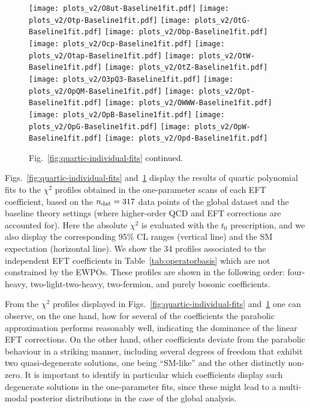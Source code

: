 \begin{figure}[htbp]
  \begin{center}
    \texttt{[image: plots\_v2/O8ut-Baseline1fit.pdf]}
\texttt{[image: plots\_v2/Otp-Baseline1fit.pdf]}
\texttt{[image: plots\_v2/OtG-Baseline1fit.pdf]}
\texttt{[image: plots\_v2/Obp-Baseline1fit.pdf]}
\texttt{[image: plots\_v2/Ocp-Baseline1fit.pdf]}
\texttt{[image: plots\_v2/Otap-Baseline1fit.pdf]}
\texttt{[image: plots\_v2/OtW-Baseline1fit.pdf]}
\texttt{[image: plots\_v2/OtZ-Baseline1fit.pdf]}
\texttt{[image: plots\_v2/O3pQ3-Baseline1fit.pdf]}
\texttt{[image: plots\_v2/OpQM-Baseline1fit.pdf]}
\texttt{[image: plots\_v2/Opt-Baseline1fit.pdf]}
\texttt{[image: plots\_v2/OWWW-Baseline1fit.pdf]}
\texttt{[image: plots\_v2/OpB-Baseline1fit.pdf]}
\texttt{[image: plots\_v2/OpG-Baseline1fit.pdf]}
\texttt{[image: plots\_v2/OpW-Baseline1fit.pdf]}
\texttt{[image: plots\_v2/Opd-Baseline1fit.pdf]}
\caption{\small Fig.~\ref{fig:quartic-individual-fits} continued.
     \label{fig:quartic-individual-fits-2} }
  \end{center}
\end{figure}

Figs.~\ref{fig:quartic-individual-fits} and~\ref{fig:quartic-individual-fits-2} display
the results of quartic polynomial fits
  to the $\chi^2$ profiles obtained  in the one-parameter scans
 of each EFT coefficient,  based on the $n_{\rm dat}=317$ data points
 of the global dataset and the baseline theory settings (where higher-order QCD and EFT
 corrections are accounted for).
 Here the absolute $\chi^2$ is evaluated with the $t_0$ prescription,
 and we also display the 
 corresponding 95\% CL ranges (vertical line) and the SM expectation (horizontal line).
 We show the 34 profiles associated to the independent EFT coefficients
 in Table~\ref{tab:operatorbasis} which are not constrained by the EWPOs.
 These profiles are shown in the following order: four-heavy, two-light-two-heavy, two-fermion,
 and purely bosonic coefficients.

From the $\chi^2$ profiles displayed in Figs.~\ref{fig:quartic-individual-fits} 
and~\ref{fig:quartic-individual-fits-2} one can observe, on the one hand,
how for several of the coefficients  the parabolic approximation 
performs reasonably well, indicating the dominance of the linear EFT corrections.
%
On the other hand, other coefficients
deviate from the parabolic behaviour in a striking manner, including
several degrees of freedom that exhibit two quasi-degenerate solutions,
one being ``SM-like'' and the other distinctly non-zero.
%
It is important to identify in particular which coefficients display such degenerate
solutions in the one-parameter fits, since these might lead to a multi-modal posterior distributions
in the case of the global analysis.

